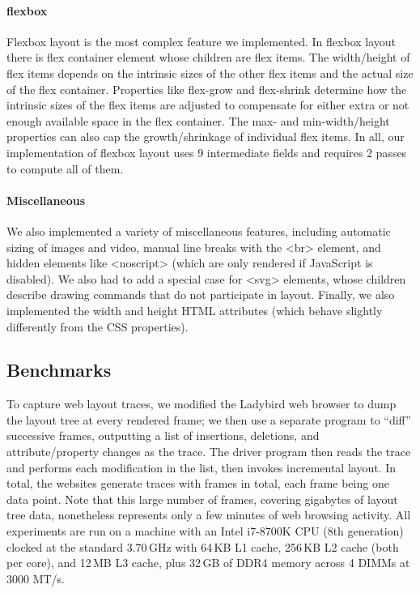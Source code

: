 \paragraph{flexbox}
Flexbox layout is the most complex feature we implemented.
In flexbox layout there is flex container element
  whose children are flex items.
The width/height of flex items depends on
  the intrinsic sizes of the other flex items and
  the actual size of the flex container.
Properties like \textsf{flex-grow} and \textsf{flex-shrink}
  determine how the intrinsic sizes of the flex items
  are adjusted to compensate for either extra or not enough
  available space in the flex container.
The \textsf{max-} and \textsf{min-width}/\textsf{height} properties
  can also cap the growth/shrinkage of individual flex items.
In all, our implementation of flexbox layout
  uses 9 intermediate fields
  and requires 2 passes to compute all of them.

\paragraph{Miscellaneous}
We also implemented a variety of miscellaneous features,
  including automatic sizing of images and video,
  manual line breaks with the \textsf{<br>} element,
  and hidden elements like \textsf{<noscript>}
  (which are only rendered if JavaScript is disabled).
We also had to add a special case for \textsf{<svg>} elements,
  whose children describe drawing commands
  that do not participate in layout.
Finally, we also implemented the \textsf{width} and \textsf{height}
  HTML attributes
  (which behave slightly differently from the CSS properties).

\subsection{Benchmarks}

To capture web layout traces,
  we modified the Ladybird web browser
  to dump the layout tree at every rendered frame;
  we then use a separate program to ``diff'' successive frames,
  outputting a list of insertions, deletions,
  and attribute/property changes as the trace.
The driver program then reads the trace
  and performs each modification in the list,
  then invokes incremental layout.
In total, the \NumWebsites websites generate traces
  with \NumFrames frames in total, each frame being one data point.
Note that this large number of frames,
  covering gigabytes of layout tree data,
  nonetheless represents only a few minutes of web browsing activity.
All experiments are run on a machine with
  an Intel i7-8700K CPU (8th generation)
  clocked at the standard 3.70\,GHz
  with 64\,KB L1 cache, 256\,KB L2 cache (both per core),
  and 12\,MB L3 cache, plus
  32\,GB of DDR4 memory across 4 DIMMs at 3000 MT/s.


